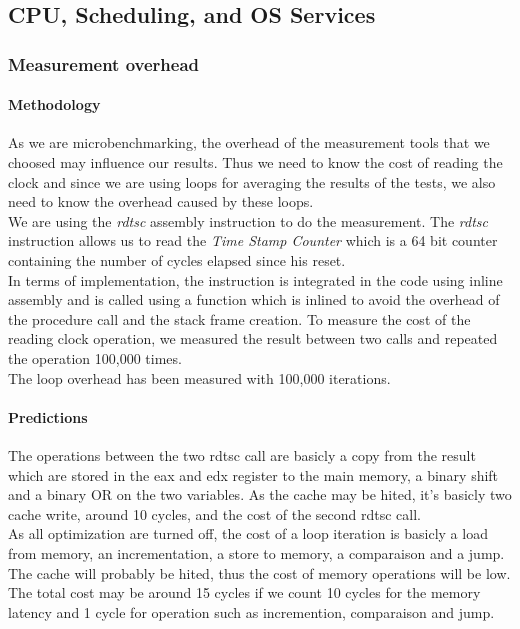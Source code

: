 \subsection{CPU, Scheduling, and OS Services}

\subsubsection{Measurement overhead}

\paragraph{Methodology}
As we are microbenchmarking, the overhead of the measurement tools that we
choosed may influence our results. Thus we need to know the cost of reading
the clock and since we are using loops for averaging the results of the tests, we
also need to know the overhead caused by these loops.\\
We are using the \emph{rdtsc} assembly instruction to do the measurement.
The \emph{rdtsc} instruction allows us to read the \emph{Time Stamp Counter}
which is a 64 bit counter containing the number of cycles elapsed since his
reset.\\
In terms of implementation, the instruction is integrated in the code using
inline assembly and is called using a function which is inlined to avoid the
overhead of the procedure call and the stack frame creation.
To measure the cost of the reading clock operation, we measured the result between
two calls and repeated the operation 100,000 times.\\
The loop overhead has been measured with 100,000 iterations.

\paragraph{Predictions}
The operations between the two rdtsc call are basicly a copy from the result
which are stored in the eax and edx register to the main memory, a binary shift
and a binary OR on the two variables.
As the cache may be hited, it's basicly two cache write, around 10 cycles, and
the cost of the second rdtsc call.\\

As all optimization are turned off, the cost of a loop iteration is basicly a
load from memory, an incrementation, a store to memory, a comparaison and a
jump.
The cache will probably be hited, thus the cost of memory operations will be low.
The total cost may be around 15 cycles if we count 10 cycles for the memory
latency and 1 cycle for operation such as incremention, comparaison and
jump.\\

